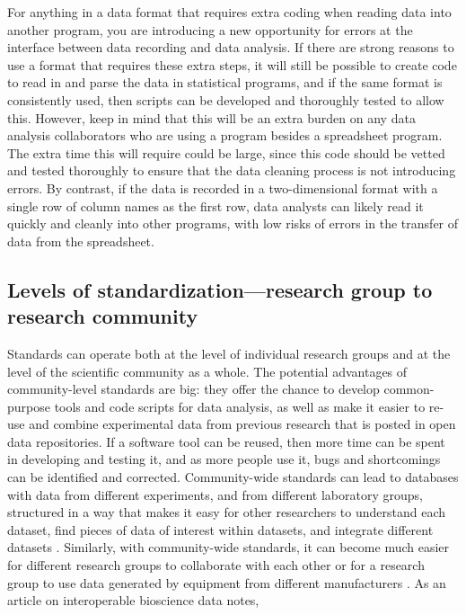 \documentclass[]{tufte-book}
\begin{document}
For anything in a data format that requires extra coding when reading data into
another program, you are introducing a new opportunity for errors at the
interface between data recording and data analysis. If there are strong reasons
to use a format that requires these extra steps, it will still be possible to
create code to read in and parse the data in statistical programs, and if the
same format is consistently used, then scripts can be developed and thoroughly
tested to allow this. However, keep in mind that this will be an extra
burden on any data analysis collaborators who are using a program besides a
spreadsheet program. The extra time this will require could be large, since
this code should be vetted and tested thoroughly to ensure that the data
cleaning process is not introducing errors. By contrast, if the data is
recorded in a two-dimensional format with a single row of column names as
the first row, data analysts can likely read it quickly and cleanly into
other programs, with low risks of errors in the transfer of data from the
spreadsheet.

\subsection{Levels of standardization---research group to research community}\label{levels-of-standardizationresearch-group-to-research-community}

Standards can operate both at the level of individual research groups and at the
level of the scientific community as a whole. The potential advantages of
community-level standards are big: they offer the chance to develop
common-purpose tools and code scripts for data analysis, as well as make it
easier to re-use and combine experimental data from previous research that is
posted in open data repositories. If a software tool can be reused, then more
time can be spent in developing and testing it, and as more people use it, bugs
and shortcomings can be identified and corrected. Community-wide standards can
lead to databases with data from different experiments, and from different
laboratory groups, structured in a way that makes it easy for other researchers
to understand each dataset, find pieces of data of interest within datasets, and
integrate different datasets \citep{lynch2008big}. Similarly, with community-wide
standards, it can become much easier for different research groups to
collaborate with each other or for a research group to use data generated by
equipment from different manufacturers \citep{schadt2010computational}. As
an article on interoperable bioscience data notes,
\end{document}
